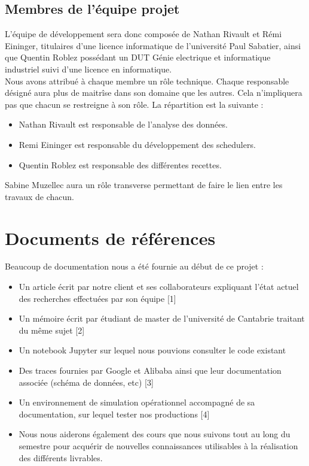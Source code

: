 \documentclass{article}
\begin{document}
\subsection{Membres de l'équipe projet}
L'équipe de développement sera donc composée de Nathan Rivault et Rémi Eininger, titulaires d'une licence informatique de l'université Paul Sabatier, ainsi que Quentin Roblez possédant un DUT Génie electrique et informatique industriel suivi d'une licence en informatique.\\
Nous avons attribué à chaque membre un rôle technique. Chaque responsable désigné aura plus de maitrîse dans son domaine que les autres. Cela n'impliquera pas que chacun se restreigne à son rôle. La répartition est la suivante :
\begin{itemize}
    \item Nathan Rivault est responsable de l'analyse des données.
    \item Remi Eininger est responsable du développement des schedulers.
    \item Quentin Roblez est responsable des différentes recettes.
\end{itemize}
Sabine Muzellec aura un rôle transverse permettant de faire le lien entre les travaux de chacun.

\section{Documents de références}
Beaucoup de documentation nous a été fournie au début de ce projet :
\begin{itemize}
    \item Un article écrit par notre client et ses collaborateurs expliquant l'état actuel des recherches effectuées par son équipe [1]
    \item Un mémoire écrit par étudiant de master de l'université de Cantabrie traitant du même sujet [2]
    \item Un notebook Jupyter sur lequel nous pouvions consulter le code existant
    \item Des traces fournies par Google et Alibaba ainsi que leur documentation associée (schéma de données, etc) [3]
    \item Un environnement de simulation opérationnel accompagné de sa documentation, sur lequel tester nos productions [4]
    \item Nous nous aiderons également des cours que nous suivons tout au long du semestre pour acquérir de nouvelles connaissances utilisables à la réalisation des différents livrables.
\end{itemize}
\end{document}
